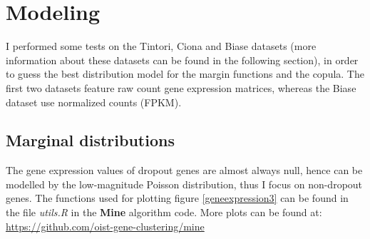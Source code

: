 \documentclass{report}
\begin{document}
{\chapter{Modeling}

I performed some tests on the Tintori, Ciona and Biase datasets (more information about these datasets can be found in the following section), in order to guess the best distribution model for the margin functions and the copula. The first two datasets feature raw count gene expression matrices, whereas the Biase dataset use normalized counts (FPKM).

\section*{Marginal distributions}

The gene expression values of dropout genes are almost always null, hence can be modelled by the low-magnitude Poisson distribution, thus I focus on non-dropout genes. The functions used for plotting figure \ref{geneexpression3} can be found in the file \textit{utils.R} in the \textbf{Mine} algorithm code. More plots can be found at: {\url{https://github.com/oist-gene-clustering/mine}}\\



}
\end{document}
